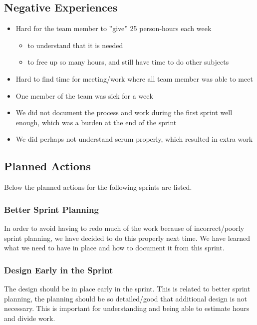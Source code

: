 \subsection{Negative Experiences}
\begin{itemize}
	\item Hard for the team member to ''give'' 25 person-hours each week
	\begin{itemize}
		\item to understand that it is needed
		\item to free up so many hours, and still have time to do other subjects
	\end{itemize}
	\item Hard to find time for meeting/work where all team member was able to meet
	\item One member of the team was sick for a week
	\item We did not document the process and work during the first sprint well enough, which was a burden at the end of the sprint
	\item We did perhaps not understand \Gls{scrum} properly, which resulted in extra work
\end{itemize}

\subsection{Planned Actions}
Below the planned actions for the following sprints are listed.

\subsubsection{Better Sprint Planning}
In order to avoid having to redo much of the work because of incorrect/poorly
sprint planning, we have decided to do this properly next time. We have learned
what we need to have in place and how to document it from this sprint.

\subsubsection{Design Early in the Sprint} 
The design should be in place early in the sprint. This is related to better
sprint planning, the planning should be so detailed/good that additional design
is not necessary. This is important for understanding and being able to
estimate hours and divide work.

